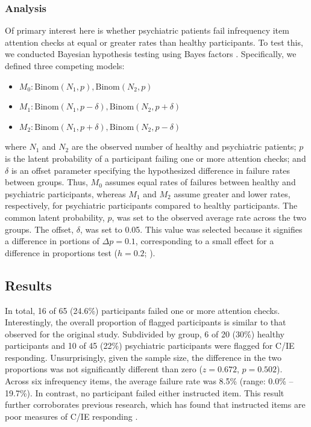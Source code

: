 \documentclass[a4paper,notitlepage,12pt]{article}
\begin{document}
\begin{refsection}[supp]
\subsubsection*{Analysis}

Of primary interest here is whether psychiatric patients fail infrequency item attention checks at equal or greater rates than healthy participants. To test this, we conducted Bayesian hypothesis testing using Bayes factors \cite{harms2018making}. Specifically, we defined three competing models:

\begin{itemize}
    \item $M_0: \text{Binom}(N_1, p), \text{Binom}(N_2, p)$  
    \item $M_1: \text{Binom}(N_1, p - \delta), \text{Binom}(N_2, p + \delta)$  
    \item $M_2: \text{Binom}(N_1, p + \delta), \text{Binom}(N_2, p - \delta)$  
\end{itemize}

where $N_1$ and $N_2$ are the observed number of healthy and psychiatric patients; $p$ is the latent probability of a participant failing one or more attention checks; and $\delta$ is an offset parameter specifying the hypothesized difference in failure rates between groups. Thus, $M_0$ assumes equal rates of failures between healthy and psychiatric participants, whereas $M_1$ and $M_2$  assume greater and lower rates, respectively, for psychiatric participants compared to healthy participants. The common latent probability, $p$, was set to the observed average rate across the two groups. The offset, $\delta$, was set to 0.05. This value was selected because it signifies a difference in portions of $\Delta p = 0.1$, corresponding to a small effect for a difference in proportions test ($h = 0.2$; \cite{cohen2013statistical}). 

\subsection*{Results}

In total, 16 of 65 (24.6\%) participants failed one or more attention checks. Interestingly, the overall proportion of flagged participants is similar to that observed for the original study. Subdivided by group, 6 of 20 (30\%) healthy participants and 10 of 45 (22\%) psychiatric participants were flagged for C/IE responding. Unsurprisingly, given the sample size, the difference in the two proportions was not significantly different than zero ($z = 0.672$, $p = 0.502$). Across six infrequency items, the average failure rate was 8.5\% (range: 0.0\% -- 19.7\%). In contrast, no participant failed either instructed item. This result further corroborates previous research, which has found that instructed items are poor measures of C/IE responding \cite{barends2019noncompliant-2, thomas2017validity-2, hauser2016attentive-2}.   


\end{refsection}
\end{document}
